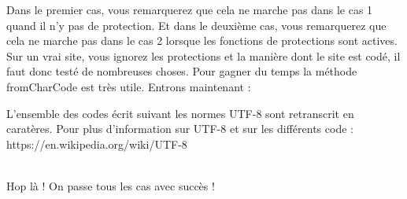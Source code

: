 \documentclass{article}
\begin{document}
Dans le premier cas, vous remarquerez que cela ne marche pas dans le cas 1 quand il n'y pas de protection. Et dans le deuxième cas, vous remarquerez que cela ne marche pas dans le cas 2 lorsque les fonctions de protections sont actives. Sur un vrai site, vous ignorez les protections et la manière dont le site est codé, il faut donc testé de nombreuses choses. Pour gagner du temps la méthode fromCharCode est très utile. Entrons maintenant :
\vspace{0.2cm}\\
\vspace{0.2cm}

L'ensemble des codes écrit suivant les normes UTF-8 sont retranscrit en caratères. Pour plus d'information sur UTF-8 et sur les différents code : https://en.wikipedia.org/wiki/UTF-8\\
\vspace{0.2cm}\\
\vspace{0.2cm}

Hop là ! On passe tous les cas avec succès !\\
\end{document}
